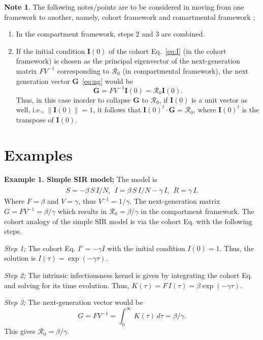 \documentclass[12pt]{article}
\DeclareRobustCommand\_{\ifmmode\expandafter\subtxt\else\textunderscore\fi}
\newcommand{\R}{\ensuremath{\mathcal{R}_0}}
\renewcommand{\vec}[1]{\ensuremath{\mathbf{#1}}} %
\theoremstyle{definition} %
\newtheorem{note}{Note}
\begin{document}
\begin{note}
The following notes/points are to be considered in moving from one framework to another, namely, cohort framework \citep{champredon2018equivalence} and comartmental framework \citep{van2002reproduction}; 
\begin{enumerate}
\item
In the compartment framework, steps 2 and 3 are combined.
\item
If the initial condition $\vec I(0)$ of the cohort Eq.~\eqref{eq:I} (in the cohort framework) is chosen as the principal eigenvector of the next-generation matrix $FV^{-1}$ corresponding to $\R$ (in compartmental framework), the next generation vector $\vec G$~\eqref{eq:ng} would be 
\begin{equation}
\vec G = FV^{-1} \vec I(0) = \R \vec I(0).
\end{equation}
Thus, in this case inorder to collapse $\vec G$ to $\R$, if $\vec I(0)$ is a unit vector as well, i.e., $\lVert \vec I(0) \rVert = 1$, it follows that $\vec I(0)^t \cdot \vec G = \R$, where $\vec I(0)^t$ is the transpose of $\vec I(0)$.
\end{enumerate}
\end{note}


\section{Examples}

{\bf Example 1. Simple SIR model;}
The model is
\begin{align}\label{mo:sir}
\dot S=-\beta\,S\,I/N,~~
\dot I= \beta\,S\,I/N -\gamma\,I,~~
\dot R= \gamma\,I.
\end{align}
Where $F=\beta$ and $V=\gamma$, thus $V^{-1}=1/\gamma$. The next-generation matrix $G=FV^{-1}=\beta/\gamma$ which results in $\R=\beta/\gamma$ in the compartment framework.
The cohort analogy of the simple SIR model is via the cohort Eq. with the following steps.

{\it Step 1;} The cohort Eq. $I'=-\gamma I$ with the initial condition $I(0)=1$. Thus, the solution is $I(\tau)=\exp(-\gamma \tau)$. 

{\it Step 2;} The intrinsic infectiousness kernel is given by integrating the cohort Eq. and solving for its time evolution.  Thus, $K(\tau)=F\,I(\tau)=\beta \exp(-\gamma \tau)$.

{\it Step 3;} The next-generation vector would be 
$$G=FV^{-1}=\int_0^\infty\,K(\tau)\,d\tau=\beta/\gamma.$$ This gives $\R=\beta/\gamma$. 
\end{document}
